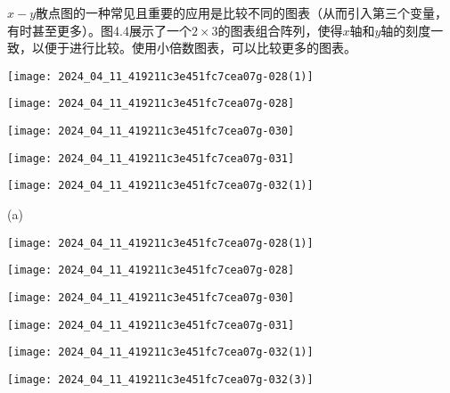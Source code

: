 $x-y$散点图的一种常见且重要的应用是比较不同的图表（从而引入第三个变量，有时甚至更多）。图4.4展示了一个$2 \times 3$的图表组合阵列，使得$x$轴和$y$轴的刻度一致，以便于进行比较。使用小倍数图表，可以比较更多的图表。

\begin{center}
\texttt{[image: 2024\_04\_11\_419211c3e451fc7cea07g-028(1)]}
\end{center}
\begin{center}
\texttt{[image: 2024\_04\_11\_419211c3e451fc7cea07g-028]}
\end{center}
\begin{center}
\texttt{[image: 2024\_04\_11\_419211c3e451fc7cea07g-030]}
\end{center}
\begin{center}
\texttt{[image: 2024\_04\_11\_419211c3e451fc7cea07g-031]}
\end{center}
\begin{center}
\texttt{[image: 2024\_04\_11\_419211c3e451fc7cea07g-032(1)]}
\end{center}

(a)

\begin{center}
\texttt{[image: 2024\_04\_11\_419211c3e451fc7cea07g-028(1)]}
\end{center}
\begin{center}
\texttt{[image: 2024\_04\_11\_419211c3e451fc7cea07g-028]}
\end{center}
\begin{center}
\texttt{[image: 2024\_04\_11\_419211c3e451fc7cea07g-030]}
\end{center}
\begin{center}
\texttt{[image: 2024\_04\_11\_419211c3e451fc7cea07g-031]}
\end{center}
\begin{center}
\texttt{[image: 2024\_04\_11\_419211c3e451fc7cea07g-032(1)]}
\end{center}
\begin{center}
\texttt{[image: 2024\_04\_11\_419211c3e451fc7cea07g-032(3)]}
\end{center}

